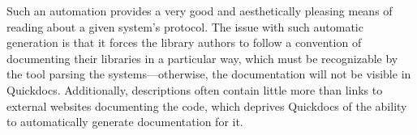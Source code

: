 Such an automation provides a very good and aesthetically pleasing means of reading about a given system's protocol. The issue with such automatic generation is that it forces the library authors to follow a convention of documenting their libraries in a particular way, which must be recognizable by the tool parsing the \ql{} systems---otherwise, the documentation will not be visible in Quickdocs. Additionally, \ql{} descriptions often contain little more than links to external websites documenting the code, which deprives Quickdocs of the ability to automatically generate documentation for it.